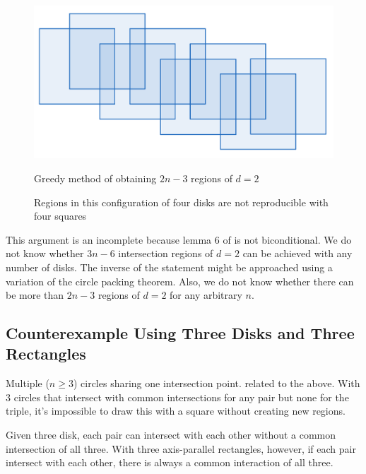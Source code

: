 \documentclass{NSF}
\begin{document}
\begin{figure}[ht]
    \centering
	\begin{minipage}[b]{.45\textwidth}
	\includegraphics[width=\textwidth]{images/depth-2-square-greedy.png}
    \caption{Greedy method of obtaining $2n-3$ regions of $d=2$}
    \label{fig:depth-2-square-greedy}
	\end{minipage}
	\hfill
    \begin{minipage}[b]{.5\textwidth}
    \caption{Regions in this configuration of four disks are not reproducible with four squares}
    \label{fig:k4-circles-squares}
    \end{minipage}
    
\end{figure}

This argument is an incomplete because  lemma 6 of \cite{Pyrga:2008:NEP:1377676.1377708} is not biconditional. We do not know whether $3n-6$ intersection regions of $d=2$ can be achieved with any number of disks. The inverse of the statement might be approached using a variation of the circle packing theorem. Also, we do not know whether there can be more than $2n-3$ regions of $d=2$ for any arbitrary $n$.

\subsection{Counterexample Using Three Disks and Three Rectangles}
\label{section:three-rectangles}
Multiple ($n\geq3$) circles sharing one intersection point.
related to the above. With 3 circles that intersect with common intersections for any pair but none for the triple, it's impossible to draw this with a square without creating new regions.

Given three disk, each pair can intersect with each other without a common intersection of all three. With three axis-parallel rectangles, however, if each pair intersect with each other, there is always a common interaction of all three.
\end{document}
